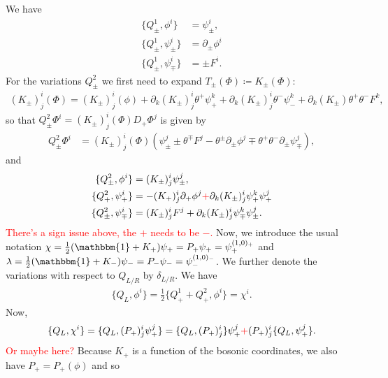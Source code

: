 \documentclass{article}
\newcommand{\id}{\mathbbm{1}}
\newcommand{\p}{\partial}
\theoremstyle{definition}
\theoremstyle{definition}
\theoremstyle{remark}
\begin{document}
We have
\begin{align*}
\{Q_\pm^1 ,\phi^i\}&=\psi_\pm^i,\\
\{Q_\pm^1 ,\psi^i_\pm\}&=\p_\pm\phi^i\\
\{Q_\pm^1 ,\psi^i_\mp\}&=\pm F^i.
\end{align*}
For the variations $Q^2_\pm$ we first need to expand $T_\pm(\Phi)\coloneqq K_\pm(\Phi)$:
\begin{align}
(K_\pm)^i_j(\Phi)=(K_\pm)^i_j(\phi)+\p_k(K_\pm)^i_j\theta^+\psi_+^k+\p_k(K_\pm)^i_j\theta^-\psi_-^k+\p_k(K_\pm)\theta^+\theta^-F^k,
\end{align}
so that $Q^2_\pm\Phi^i=(K_\pm)^i_j(\Phi)D_+\Phi^j$ is given by
\begin{align}
Q^2_\pm\Phi^i&=(K_\pm)^i_j(\Phi)(\psi^j_\pm\pm\theta^\mp F^j-\theta^\pm\p_\pm\phi^j\mp\theta^+\theta^-\p_\pm\psi^j_\mp),
\end{align}
and
\begin{align}
\{Q_\pm^2 ,\phi^i\}&=(K_\pm)^i_j\psi_\pm^j,\\
\{Q_+^2 ,\psi^i_+\}&=-(K_+)^i_j\p_+\phi^j{\textcolor{red}{+}}\p_k(K_\pm)^i_j\psi_+^k\psi_+^j\\
\{Q_\pm^2 ,\psi^i_\mp\}&=(K_\pm)^i_jF^j+\p_k(K_\pm)^i_j\psi^k_\mp\psi^j_\pm.
\end{align}
\textcolor{red}{There's a sign issue above, the $+$ needs to be $-$.}
Now, we introduce the usual notation $\chi=\frac{1}{2}(\id+K_+)\psi_+=P_+\psi_+=\psi_+^{(1,0)_+}$ and $\lambda=\frac{1}{2}(\id+K_-)\psi_-=P_-\psi_-=\psi_-^{(1,0)_-}$. We further denote the variations with respect to $Q_{L/R}$ by $\delta_{L/R}$. We have
\begin{align}
\{Q_L,\phi^i\}=\frac{1}{2}\{Q_+^1+Q^2_+,\phi^i\}=\chi^i.
\end{align}
Now, %
\begin{align}
\{Q_L,\chi^i\}=\{Q_L,(P_+)^i_j\psi_+^j\}=\{Q_L,(P_+)^i_j\}\psi_+^j\textcolor{red}{+}(P_+)^i_j\{Q_L,\psi_+^j\}.
\end{align}
\textcolor{red}{Or maybe here?}
Because $K_+$ is a function of the bosonic coordinates, we also have $P_+=P_+(\phi)$ and so
\end{document}
